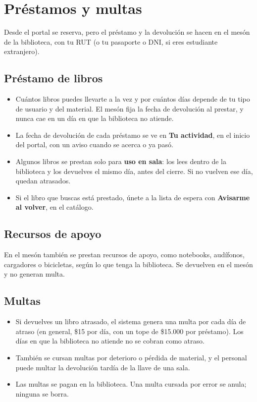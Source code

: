 \documentclass[11pt,a4paper]{report}
\begin{document}
\chapter{Préstamos y multas}
\label{cap:meson}

Desde el portal se reserva, pero el préstamo y la devolución se hacen en el
mesón de la biblioteca, con tu RUT (o tu pasaporte o DNI, si eres
estudiante extranjero).

\section{Préstamo de libros}

\begin{itemize}
  \item Cuántos libros puedes llevarte a la vez y por cuántos días depende
  de tu tipo de usuario y del material. El mesón fija la fecha de
  devolución al prestar, y nunca cae en un día en que la biblioteca no
  atiende.
  \item La fecha de devolución de cada préstamo se ve en \textbf{Tu
  actividad}, en el inicio del portal, con un aviso cuando se acerca o ya
  pasó.
  \item Algunos libros se prestan solo para \textbf{uso en sala}: los lees
  dentro de la biblioteca y los devuelves el mismo día, antes del cierre.
  Si no vuelven ese día, quedan atrasados.
  \item Si el libro que buscas está prestado, únete a la lista de espera
  con \textbf{Avisarme al volver}, en el catálogo.
\end{itemize}

\section{Recursos de apoyo}

En el mesón también se prestan recursos de apoyo, como notebooks,
audífonos, cargadores o bicicletas, según lo que tenga la biblioteca. Se
devuelven en el mesón y no generan multa.

\section{Multas}

\begin{itemize}
  \item Si devuelves un libro atrasado, el sistema genera una multa por cada
  día de atraso (en general, \$15 por día, con un tope de \$15.000 por
  préstamo). Los días en que la biblioteca no atiende no se cobran como
  atraso.
  \item También se cursan multas por deterioro o pérdida de material, y el
  personal puede multar la devolución tardía de la llave de una sala.
  \item Las multas se pagan en la biblioteca. Una multa cursada por error se
  anula; ninguna se borra.
\end{itemize}
\end{document}
